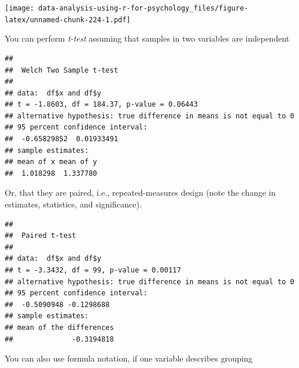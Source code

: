 \documentclass[
]{book}
\newenvironment{Shaded}{\begin{snugshade}}{\end{snugshade}}
\newcommand{\AttributeTok}[1]{\textcolor[rgb]{0.77,0.63,0.00}{#1}}
\newcommand{\ConstantTok}[1]{\textcolor[rgb]{0.00,0.00,0.00}{#1}}
\newcommand{\DecValTok}[1]{\textcolor[rgb]{0.00,0.00,0.81}{#1}}
\newcommand{\FunctionTok}[1]{\textcolor[rgb]{0.00,0.00,0.00}{#1}}
\newcommand{\NormalTok}[1]{#1}
\newcommand{\OtherTok}[1]{\textcolor[rgb]{0.56,0.35,0.01}{#1}}
\newcommand{\SpecialCharTok}[1]{\textcolor[rgb]{0.00,0.00,0.00}{#1}}
\newcommand{\StringTok}[1]{\textcolor[rgb]{0.31,0.60,0.02}{#1}}
\begin{document}
\texttt{[image: data-analysis-using-r-for-psychology\_files/figure-latex/unnamed-chunk-224-1.pdf]}

You can perform \emph{t-test} assuming that samples in two variables are independent

\begin{Shaded}
\end{Shaded}

\begin{verbatim}
## 
##  Welch Two Sample t-test
## 
## data:  df$x and df$y
## t = -1.8603, df = 184.37, p-value = 0.06443
## alternative hypothesis: true difference in means is not equal to 0
## 95 percent confidence interval:
##  -0.65829852  0.01933491
## sample estimates:
## mean of x mean of y 
##  1.018298  1.337780
\end{verbatim}

Or, that they are paired, i.e., repeated-measures design (note the change in estimates, statistics, and significance).

\begin{Shaded}
\end{Shaded}

\begin{verbatim}
## 
##  Paired t-test
## 
## data:  df$x and df$y
## t = -3.3432, df = 99, p-value = 0.00117
## alternative hypothesis: true difference in means is not equal to 0
## 95 percent confidence interval:
##  -0.5090948 -0.1298688
## sample estimates:
## mean of the differences 
##              -0.3194818
\end{verbatim}

You can also use formula notation, if one variable describes grouping

\begin{Shaded}
\end{Shaded}
\end{document}
